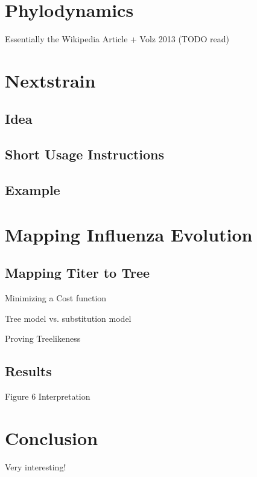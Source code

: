 \documentclass[12pt]{article}
\begin{document}
\section{Phylodynamics}

  Essentially the Wikipedia Article + Volz 2013 (TODO read)


\section{Nextstrain}

  \subsection{Idea}

  \subsection{Short Usage Instructions}

  \subsection{Example}

\section{Mapping Influenza Evolution}

  \subsection{Mapping Titer to Tree}

    Minimizing a Cost function

    Tree model vs. substitution model

    Proving Treelikeness

  \subsection{Results}

    Figure 6 Interpretation

\section{Conclusion}

  Very interesting!





% 

% 
\end{document}
